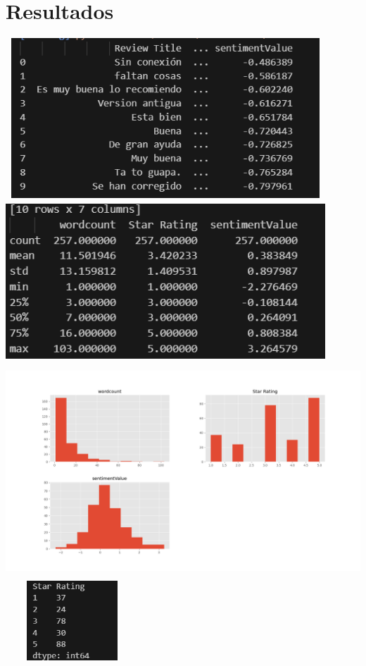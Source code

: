 \documentclass{article}
\begin{document}
\section{Resultados}
\includegraphics[width=12cm, height=6cm]{tabla1.png} 
\\
\includegraphics[width=12cm, height=6cm]{tabla2.png} 
\\
\includegraphics[width=14cm, height=8cm]{Figure_1.png} 
\\
\includegraphics[width=5cm, height=3cm]{tabla3.png} 
\end{document}
